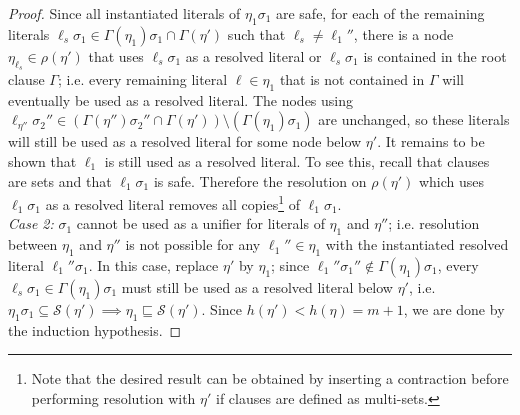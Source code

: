 \begin{proof}
Since all instantiated literals of $\eta_1\sigma_1$ are safe, for each of the remaining literals $\ell_s \sigma_1 \in \Gamma(\eta_1)\sigma_1 \cap \Gamma(\eta')$ such that $\ell_s\neq \ell_1''$, there is a node $\eta_{\ell_s}\in \rho(\eta')$ that uses $\ell_s\sigma_1$ as a resolved literal or $\ell_s\sigma_1$ is contained in the root clause $\Gamma$; i.e. every remaining literal $\ell \in \eta_1$ that is not contained in $\Gamma$ will eventually be used as a resolved literal. The nodes using $\ell_{\eta''}\sigma_2'' \in (\Gamma(\eta'')\sigma_2''\cap\Gamma(\eta'))\setminus (\Gamma(\eta_1)\sigma_1)$ are unchanged, so these literals will still be used as a resolved literal for some node below $\eta'$. 
It remains to be shown that $\ell_1$ is still used as a resolved literal. To see this, recall that clauses are sets and that $\ell_1\sigma_1$ is safe. Therefore the resolution on $\rho(\eta')$ which uses $\ell_1\sigma_1$ as a resolved literal removes all copies\footnote{Note that the desired result can be obtained by inserting a contraction before performing resolution with $\eta'$ if clauses are defined as multi-sets.} of $\ell_1\sigma_1$. \\


\noindent
\emph{Case 2:} $\sigma_1$ cannot be used as a unifier for literals of $\eta_1$ and $\eta''$; i.e. resolution between $\eta_1$ and $\eta''$ is not possible for any $\ell_1''\in \eta_1$ 
with the instantiated resolved literal $\ell_1''\sigma_1$. In this case, replace $\eta'$ by $\eta_1$; since $\ell_1''\sigma_1'' \notin \Gamma(\eta_1)\sigma_1$, every $\ell_s\sigma_1 \in \Gamma(\eta_1)\sigma_1$ must still be used as a resolved literal below $\eta'$, i.e. $\eta_1\sigma_1 \subseteq \mathcal{S}(\eta') \implies \eta_1 \sqsubseteq \mathcal{S}(\eta')$. Since $h(\eta') < h(\eta)=m+1$, we are done by the induction hypothesis. 


\end{proof}

